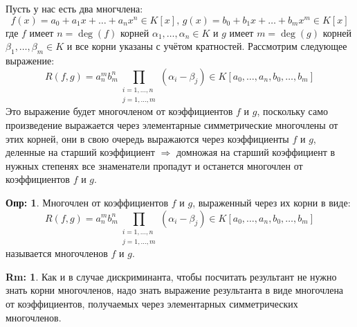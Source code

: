 \documentclass[12pt]{article}
\theoremstyle{definition}
\newtheorem{defn}{Опр:}
\newtheorem{rem}{Rm:}
\begin{document}
Пусть у нас есть два многчлена: 
$$
	f(x) = a_0 + a_1x + \dotsc+ a_n x^n \in K[x], \, g(x) = b_0 + b_1x + \dotsc+ b_m x^m \in K[x]
$$ 
где $f$ имеет $n = \deg(f)$ корней $\alpha_1,\dotsc,\alpha_n \in K$ и $g$ имеет $m = \deg(g)$ корней $\beta_1,\dotsc,\beta_m \in K$ и все корни указаны с учётом кратностей. Рассмотрим следующее выражение:
$$
	R(f,g) = a_n^m b_m^n\prod\limits_{\substack{i =1,\dotsc,n \\ j = 1,\dotsc,m}}(\alpha_i - \beta_j) \in K[a_0,\dotsc,a_n, b_0,\dotsc,b_m]
$$
Это выражение будет многочленом от коэффициентов $f$ и $g$, поскольку само произведение выражается через элементарные симметрические многочлены от этих корней, они в свою очередь выражаются через коэффициенты $f$ и $g$, деленные на старший коэффициент $\Rightarrow$ домножая на старший коэффициент в нужных степенях все знаменатели пропадут и останется многочлен от коэффициентов $f$ и $g$.
\begin{defn}
	Многочлен от коэффициентов $f$ и $g$, выраженный через их корни в виде:
	$$
		R(f,g) = a_n^m b_m^n\prod\limits_{\substack{i =1,\dotsc,n \\ j = 1,\dotsc,m}}(\alpha_i - \beta_j) \in K[a_0,\dotsc,a_n, b_0,\dotsc,b_m]
	$$
	называется  многочленов $f$ и $g$.
\end{defn}
\begin{rem}
	Как и в случае дискриминанта, чтобы посчитать результант не нужно знать корни многочленов, надо знать выражение результанта в виде многочлена от коэффициентов, получаемых через элементарных симметрических многочленов.
\end{rem}
\end{document}
